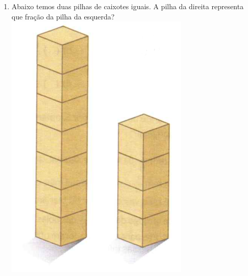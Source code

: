 \documentclass[a4paper,14pt]{article}
\begin{document}
\begin{multicols}{2}
\begin{enumerate}
\begin{enumerate}[a)]
			\end{enumerate}
			\item Abaixo temos duas pilhas de caixotes iguais. A pilha da direita representa que fração da pilha da esquerda?
			\includegraphics[width=1\linewidth]{6FMA07_imagens/imagem11} \\\\\\
		\end{enumerate}

\end{multicols}
\end{document}
